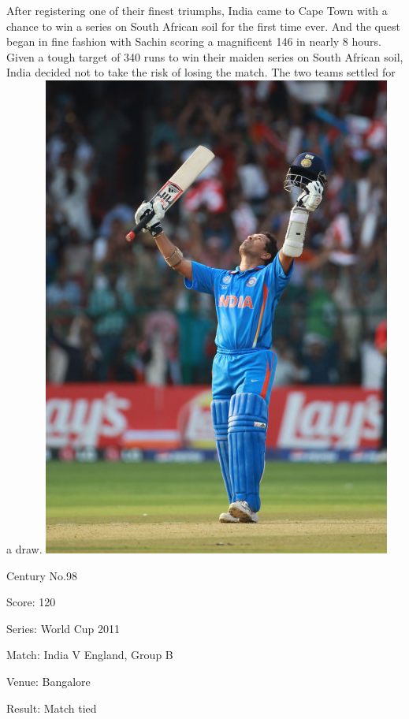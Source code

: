 \documentclass[11pt, a4paper]{article}
\begin{document}
After registering one of their finest triumphs, India came to Cape Town with a chance to win a series on South African soil for the first time ever. And the quest began in fine fashion with Sachin scoring a magnificent 146 in nearly 8 hours. Given a tough target of 340 runs to win their maiden series on South African soil, India decided not to take the risk of losing the match. The two teams settled for a draw.
\newpage
\includegraphics[height=0.7\textheight]{pics/98.jpg}

Century No.98 

Score: 120 

Series: World Cup 2011 

Match: India V England, Group B 

Venue: Bangalore 

Result: Match tied 
\end{document}
